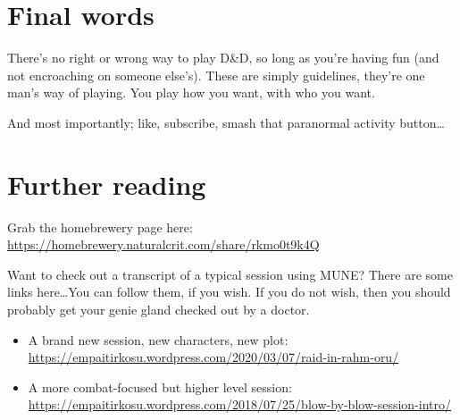\documentclass[12pt, letterpaper]{article}
\begin{document}
\section*{Final words}

There's no right or wrong way to play D\&D, so long as you're having fun (and not encroaching on someone else's). These are simply guidelines, they're one man's way of playing. You play how you want, with who you want.

And most importantly; like, subscribe, smash that paranormal activity button\ldots

\section*{Further reading}

Grab the homebrewery page here: \url{https://homebrewery.naturalcrit.com/share/rkmo0t9k4Q}

Want to check out a transcript of a typical session using MUNE? There are some links here\ldots You can follow them, if you wish. If you do not wish, then you should probably get your genie gland checked out by a doctor.
\begin{itemize}
\item A brand new session, new characters, new plot: \url{https://empaitirkosu.wordpress.com/2020/03/07/raid-in-rahm-oru/}
\item A more combat-focused but higher level session: \url{https://empaitirkosu.wordpress.com/2018/07/25/blow-by-blow-session-intro/}
\end{itemize}
\end{document}
